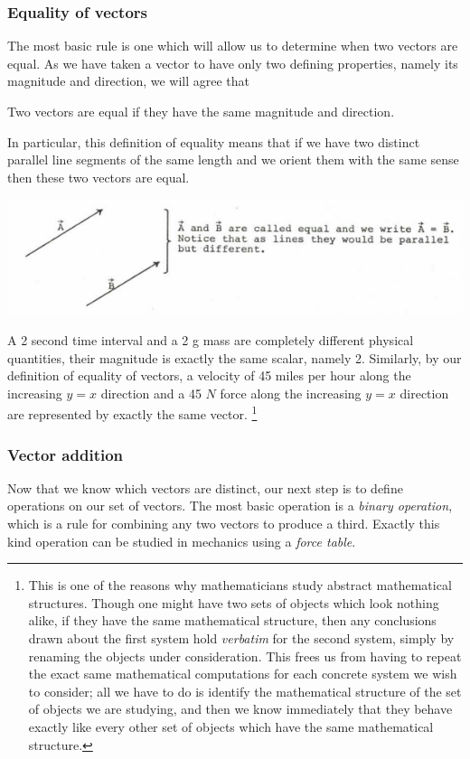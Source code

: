 \documentclass[12pt,letterpaper,reqno]{article}
\numberwithin{equation}{section}
\newcommand{\ti}[1]{\textit{#1}}
\begin{document}
\subsubsection{Equality of vectors}
The most basic rule is one which will allow us to determine when two vectors are equal. As we have taken a vector to have only two defining properties, namely its magnitude and direction, we will agree that
\begin{defn}
Two vectors are equal if they have the same magnitude and direction.	
\end{defn}
In particular, this definition of equality means that if we have two distinct parallel line segments of the same length and we orient them with the same sense then these two vectors are equal.
\begin{center}
	\includegraphics[scale=0.5]{figures_mvc/equal_vectors_new}
\end{center}
\begin{example}
A 2 second time interval and a 2 g mass are completely different physical quantities, their magnitude is exactly the same scalar, namely 2. Similarly, by our definition of equality of vectors, a velocity of 45 miles per hour along the increasing $y=x$ direction and a 45 $N$ force along the increasing $y=x$ direction are represented by exactly the same vector. \footnote{This is one of the reasons why mathematicians study abstract mathematical structures. Though one might have two sets of objects which look nothing alike, if they have the same mathematical structure, then any conclusions drawn about the first system hold \ti{verbatim} for the second system, simply by renaming the objects under consideration. This frees us from having to repeat the exact same mathematical computations for each concrete system we wish to consider; all we have to do is identify the mathematical structure of the set of objects we are studying, and then we know immediately that they behave exactly like every other set of objects which have the same mathematical structure.} 
\end{example}

\subsubsection{Vector addition}
Now that we know which vectors are distinct, our next step is to define operations on our set of vectors. The most basic operation is a \ti{binary operation}, which is a rule for combining any two vectors to produce a third. Exactly this kind operation can be studied in mechanics using a \ti{force table}.
\end{document}

